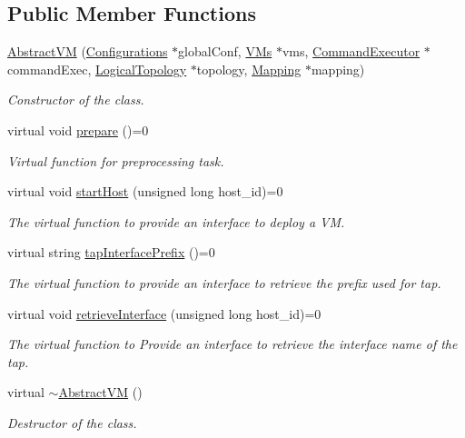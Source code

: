 \subsection*{\-Public \-Member \-Functions}
\begin{DoxyCompactItemize}
\item 
\hyperlink{classAbstractVM_ac796bbef686b746fc9504bc8e2f2e096}{\-Abstract\-V\-M} (\hyperlink{classConfigurations}{\-Configurations} $\ast$global\-Conf, \hyperlink{classVMs}{\-V\-Ms} $\ast$vms, \hyperlink{classCommandExecutor}{\-Command\-Executor} $\ast$command\-Exec, \hyperlink{classLogicalTopology}{\-Logical\-Topology} $\ast$topology, \hyperlink{classMapping}{\-Mapping} $\ast$mapping)
\begin{DoxyCompactList}\small\item\em \-Constructor of the class. \end{DoxyCompactList}\item 
\hypertarget{classAbstractVM_a2a4e949346eba48ae05a6eab5106c9b9}{virtual void \hyperlink{classAbstractVM_a2a4e949346eba48ae05a6eab5106c9b9}{prepare} ()=0}\label{classAbstractVM_a2a4e949346eba48ae05a6eab5106c9b9}

\begin{DoxyCompactList}\small\item\em \-Virtual function for preprocessing task. \end{DoxyCompactList}\item 
virtual void \hyperlink{classAbstractVM_a85958cf509c4eafa9072693346bf0d65}{start\-Host} (unsigned long host\-\_\-id)=0
\begin{DoxyCompactList}\small\item\em \-The virtual function to provide an interface to deploy a \-V\-M. \end{DoxyCompactList}\item 
virtual string \hyperlink{classAbstractVM_ae2fa8799756c7ca16b29bfccd9051a1f}{tap\-Interface\-Prefix} ()=0
\begin{DoxyCompactList}\small\item\em \-The virtual function to provide an interface to retrieve the prefix used for tap. \end{DoxyCompactList}\item 
virtual void \hyperlink{classAbstractVM_a02beee0b81284b2dfa5d98e3c26a2586}{retrieve\-Interface} (unsigned long host\-\_\-id)=0
\begin{DoxyCompactList}\small\item\em \-The virtual function to \-Provide an interface to retrieve the interface name of the tap. \end{DoxyCompactList}\item 
\hypertarget{classAbstractVM_a46f89fb31978ef78f568d529d1873027}{virtual \hyperlink{classAbstractVM_a46f89fb31978ef78f568d529d1873027}{$\sim$\-Abstract\-V\-M} ()}\label{classAbstractVM_a46f89fb31978ef78f568d529d1873027}

\begin{DoxyCompactList}\small\item\em \-Destructor of the class. \end{DoxyCompactList}\end{DoxyCompactItemize}
